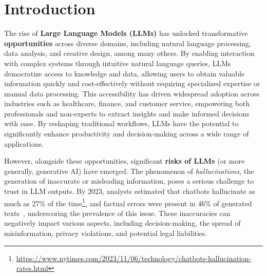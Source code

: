 \section{Introduction}
\label{sec:intro}


The rise of \textbf{Large Language Models (LLMs)} has unlocked transformative {\bf opportunities} across diverse domains, including natural language processing, data analysis, and creative design, among many others. By enabling interaction with complex systems through intuitive natural language queries, LLMs democratize access to knowledge and data, allowing users to obtain valuable information quickly and cost-effectively without requiring specialized expertise or manual data processing. This accessibility has driven widespread adoption across industries such as healthcare, finance, and customer service, empowering both professionals and non-experts to extract insights and make informed decisions with ease. By reshaping traditional workflows, LLMs have the potential to significantly enhance productivity and decision-making across a wide range of applications.


However, alongside these opportunities, significant {\bf risks of LLMs} (or more generally, generative AI) have emerged. The phenomenon of {\em hallucinations}, \ie the generation of inaccurate or misleading information, poses a serious challenge to trust in LLM outputs. By 2023, analysts estimated that chatbots hallucinate as much as 27\% of the time\footnote{\url{https://www.nytimes.com/2023/11/06/technology/chatbots-hallucination-rates.html}}, and factual errors were present in 46\% of generated texts~\cite{de2023evaluation}, underscoring the prevalence of this issue.
These inaccuracies can negatively impact various aspects, including decision-making, the spread of misinformation, privacy violations, and potential legal liabilities. %


